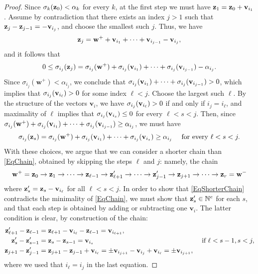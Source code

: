 \documentclass[11pt,twoside]{amsart}
\newcommand{\N}{\mathbb N}
\def\bv{{\mathbf v}}
\def\bw{{\mathbf w}}
\theoremstyle{definition}
\numberwithin{equation}{section}
\begin{document}
\begin{proof}
Since $\sigma_k({\bf z}_0) < \alpha_k$ for every $k$, at the first step we must have 
${\bf z}_1  ={\bf z}_{0}+ {\bf v}_{i_1}$.
Assume by contradiction that 
there exists an index $j > 1$ such that ${\bf z}_j -{\bf z}_{j-1}=-{\bf v}_{i_j}$, and choose the smallest such $j$.
Thus, we have
$$
{\bf z}_j = \bw^+ + {\bf v}_{i_1} + \cdots + {\bf v}_{i_{j-1}}-{\bf v}_{i_j},
$$
and it follows that
$$
0 \le \sigma_{i_j}({\bf z}_j) = \sigma_{i_j}(\bw^+) + \sigma_{i_j}({\bf v}_{i_1}) + \cdots + \sigma_{i_j}({\bf v}_{i_{j-1}})-\alpha_{i_j}.
$$
Since $\sigma_{i_j}(\bw^+) < \alpha_{i_j}$, 
we conclude that $ \sigma_{i_j}({\bf v}_{i_1}) + \cdots + \sigma_{i_j}({\bf v}_{i_{j-1}}) > 0$, 
which implies that $\sigma_{i_j}({\bf v}_{i_\ell}) > 0$ for some index $\ell<j$. 
Choose the largest such $\ell$. 
By the structure of the vectors $\bv_i$, we have
 $\sigma_{i_j}({\bf v}_{i_\ell}) > 0$ if and only if $i_j = i_\ell$, 
 and maximality of $\ell$ implies that $\sigma_{i_j}({\bf v}_{i_s}) \le 0$ for every $\ell < s < j$. 
 Then, since $\sigma_{i_j}(\bw^+) + \sigma_{i_j}({\bf v}_{i_1}) + \cdots + \sigma_{i_j}({\bf v}_{i_{j-1}}) \ge \alpha_{i_j}$, we must have 
 \begin{equation}\label{EqSigmaij}
 \sigma_{i_j}({\bf z}_s) =
      \sigma_{i_j}(\bw^+) + \sigma_{i_j}({\bf v}_{i_1}) + \cdots + \sigma_{i_j}({\bf v}_{i_{s}}) \ge \alpha_{i_j} \quad \text{ for every }\ell < s < j.
      \end{equation}
 With these choices, we argue that we can consider a shorter chain than \eqref{EqChain}, obtained by skipping the steps $\ell$ and $j$: namely, the chain
\begin{equation}\label{EqShorterChain}
\bw^+ = {\bf z}_0 \rightarrow {\bf z}_1 \rightarrow \cdots \rightarrow {\bf z}_{\ell-1} \rightarrow {\bf z}'_{\ell+1}  \rightarrow 
\cdots \rightarrow {\bf z}'_{j-1} \rightarrow {\bf z}_{j+1}  \rightarrow \cdots \rightarrow
{\bf z}_r = \bw^-
    \end{equation}
 where ${\bf z}'_{s}  = {\bf z}_{s} - {\bf v}_{i_\ell}$ for all $ \ell < s < j$. 
 In order to show that \eqref{EqShorterChain} contradicts the minimality of \eqref{EqChain}, 
we must show that ${\bf z}'_{s} \in \N^e$ for each $s$, and that each step is obtained by adding or subtracting one $\bv_i$.
The latter condition is clear, by construction of the chain:
\begin{align*}
{\bf z}'_{\ell+1}-{\bf z}_{\ell-1}&={\bf z}_{\ell+1}-{\bf v}_{i_\ell}-{\bf z}_{\ell-1}= \bv_{i_{\ell+1}},
\\
{\bf z}'_{s}-{\bf z}'_{s-1}&=
{\bf z}_{s}-{\bf z}_{s-1}  = \bv_{i_s}  & \text{ if }\ell < s-1, s < j,\\
{\bf z}_{j+1}-{\bf z}'_{j-1}&= {\bf z}_{j+1}-{\bf z}_{j-1}+{\bf v}_{i_\ell} =
\pm {\bf v}_{i_{j+1}} - {\bf v}_{i_j}+{\bf v}_{i_\ell} = \pm {\bf v}_{i_{j+1}},
\end{align*}
 where we used that $i_\ell = i_j$ in the last equation.


\end{proof}
\end{document}

